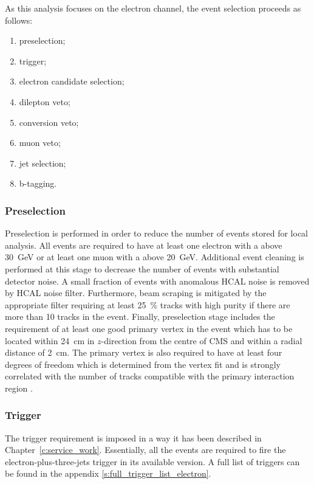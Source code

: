 
As this analysis focuses on the electron channel, the event selection proceeds as follows:

\begin{enumerate}[topsep=\parskip, parsep=\parskip, itemsep=\parskip, leftmargin=\leftmargin]
	\item preselection;
	\item trigger;
	\item electron candidate selection;
	\item dilepton veto;
	\item conversion veto;
	\item muon veto;
	\item jet selection;
	\item b-tagging.
\end{enumerate}

\subsubsection*{Preselection}
Preselection is performed in order to reduce the number of events stored for local analysis. All events are required to
have at least one electron with a \pt above \SI{30}{\GeV} or at least one muon with a \pt above \SI{20}{\GeV}.
Additional event cleaning is performed at this stage to decrease the number of events with substantial detector noise. A
small fraction of events with anomalous HCAL noise is removed by HCAL noise filter. Furthermore, beam scraping is
mitigated by the appropriate filter requiring at least \SI{25}{\percent} tracks with high purity if there are more than
\num{10} tracks in the event. Finally, preselection stage includes the requirement of at least one good primary vertex
in the event which has to be located within \SI{24}{\cm} in $z$-direction from the centre of CMS and within a radial
distance of \SI{2}{\cm}. The primary vertex is also required to have at least four degrees of freedom which is
determined from the vertex fit and is strongly correlated with the number of tracks compatible with the primary
interaction region \autocite{Tacking_PV_results_7TeV}.

\subsubsection*{Trigger}
The trigger requirement is imposed in a way it has been described in Chapter~\ref{c:service_work}. Essentially, all the
events are required to fire the electron-plus-three-jets trigger in its available version. A full list of triggers can
be found in the appendix \ref{s:full_trigger_list_electron}.

